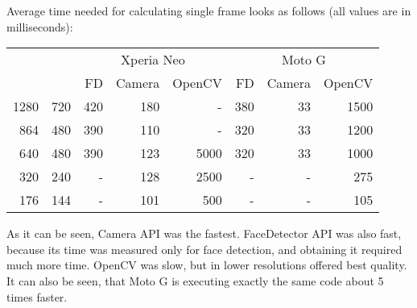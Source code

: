 Average time needed for calculating single frame looks as follows (all values
are in milliseconds):
\begin{center}
\begin{tabular}{r@{ x }l|r|r|r|r|r|r}
\multicolumn{2}{c|}{} & \multicolumn{3}{c|}{Xperia Neo} &
\multicolumn{3}{c}{Moto G}
\\
\multicolumn{2}{c|}{} & \hspace{4ex}FD & Camera & OpenCV & \hspace{4ex}FD &
Camera & OpenCV
\\
\hline 1280 & 720 & 420 & 180 & - & 380 & 33 & 1500 \\
864 & 480 & 390 & 110 & - & 320 & 33 & 1200 \\
640 & 480 & 390 & 123 & 5000 & 320 & 33 & 1000 \\
320 & 240 & - & 128 & 2500 & - & - & 275 \\
176 & 144 & - & 101 & 500 & - & - & 105
\end{tabular}
\end{center}
As it can be seen, Camera API was the fastest. 
FaceDetector API was also fast, because its time was measured only for face
detection, and obtaining it required much more time.
OpenCV was slow, but in lower resolutions offered best quality.
It can also be seen, that Moto G is executing exactly the same code about 5
times faster.

